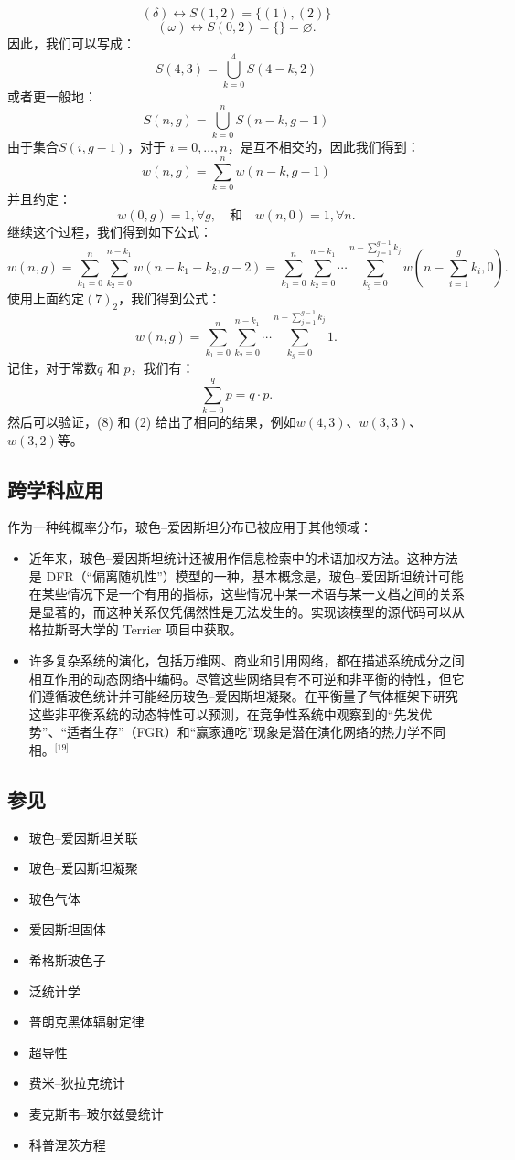 \[
(\delta) \longleftrightarrow S(1, 2) = \{ (1), (2) \}~
\]
\[
(\omega) \longleftrightarrow S(0, 2) = \{\} = \varnothing.~
\]
因此，我们可以写成：
\[
S(4, 3) = \bigcup_{k = 0}^{4} S(4 - k, 2)~
\]
或者更一般地：
\[
S(n, g) = \bigcup_{k = 0}^{n} S(n - k, g - 1)~
\]
由于集合\( S(i, g - 1) \)，对于 \( i = 0, \dots, n \)，是互不相交的，因此我们得到：
\[
w(n, g) = \sum_{k = 0}^{n} w(n - k, g - 1)~
\]
并且约定：
\[
w(0, g) = 1, \forall g, \quad \text{和} \quad w(n, 0) = 1, \forall n.~
\]
继续这个过程，我们得到如下公式：
\[
w(n, g) = \sum_{k_1 = 0}^{n} \sum_{k_2 = 0}^{n - k_1} w(n - k_1 - k_2, g - 2) = \sum_{k_1 = 0}^{n} \sum_{k_2 = 0}^{n - k_1} \cdots \sum_{k_g = 0}^{n - \sum_{j = 1}^{g - 1} k_j} w(n - \sum_{i = 1}^{g} k_i, 0).~
\]
使用上面约定\((7)_2\)，我们得到公式：
\[
w(n, g) = \sum_{k_1 = 0}^{n} \sum_{k_2 = 0}^{n - k_1} \cdots \sum_{k_g = 0}^{n - \sum_{j = 1}^{g - 1} k_j} 1.~
\]
记住，对于常数\( q \) 和 \( p \)，我们有：
\[
\sum_{k = 0}^{q} p = q \cdot p.~
\]
然后可以验证，(8) 和 (2) 给出了相同的结果，例如\( w(4, 3) \)、\( w(3, 3) \)、\( w(3, 2) \)等。
\subsection{跨学科应用}
作为一种纯概率分布，玻色–爱因斯坦分布已被应用于其他领域：
\begin{itemize}
\item 近年来，玻色–爱因斯坦统计还被用作信息检索中的术语加权方法。这种方法是 DFR（“偏离随机性”）模型的一种，基本概念是，玻色–爱因斯坦统计可能在某些情况下是一个有用的指标，这些情况中某一术语与某一文档之间的关系是显著的，而这种关系仅凭偶然性是无法发生的。实现该模型的源代码可以从格拉斯哥大学的 Terrier 项目中获取。
\item 许多复杂系统的演化，包括万维网、商业和引用网络，都在描述系统成分之间相互作用的动态网络中编码。尽管这些网络具有不可逆和非平衡的特性，但它们遵循玻色统计并可能经历玻色–爱因斯坦凝聚。在平衡量子气体框架下研究这些非平衡系统的动态特性可以预测，在竞争性系统中观察到的“先发优势”、“适者生存”（FGR）和“赢家通吃”现象是潜在演化网络的热力学不同相。\(^\text{[19]}\)
\end{itemize}
\subsection{参见}
\begin{itemize}
\item 玻色–爱因斯坦关联
\item 玻色–爱因斯坦凝聚
\item 玻色气体
\item 爱因斯坦固体
\item 希格斯玻色子
\item 泛统计学
\item 普朗克黑体辐射定律
\item 超导性
\item 费米–狄拉克统计
\item 麦克斯韦–玻尔兹曼统计
\item 科普涅茨方程
\end{itemize}

